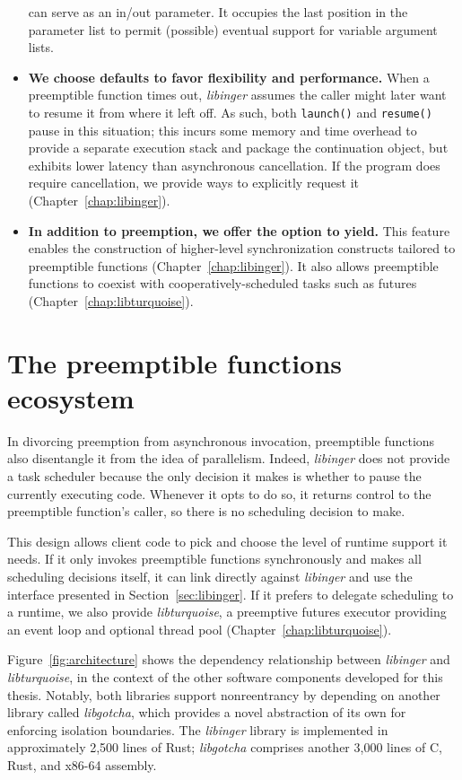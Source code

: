 \begin{itemize}
	can serve as an in/out parameter.  It occupies the last position in the
	parameter list to permit (possible) eventual support for variable argument
	lists.
\item \textbf{We choose defaults to favor flexibility and performance.}  When a
	preemptible function times out, \textit{libinger} assumes the caller might
	later want to resume it from where it left off.  As such, both
	\texttt{launch()} and \texttt{resume()} pause in this situation; this incurs
	some memory and time overhead to provide a separate execution stack and
	package the continuation object, but exhibits lower latency than
	asynchronous cancellation.  If the program does require cancellation, we
	provide ways to explicitly request it (Chapter~\ref{chap:libinger}).
\item \textbf{In addition to preemption, we offer the option to yield.} This feature
	enables the construction of higher-level synchronization constructs tailored
	to preemptible functions (Chapter~\ref{chap:libinger}).  It also allows
	preemptible functions to coexist with cooperatively-scheduled tasks
	such as futures (Chapter~\ref{chap:libturquoise}).
\end{itemize}


\section{The preemptible functions ecosystem}
\label{sec:libinger:concurrency}

In divorcing preemption from asynchronous invocation, preemptible functions also
disentangle it from the idea of parallelism.  Indeed, \textit{libinger} does not
provide a task scheduler because the only decision it makes is whether to pause the
currently executing code.  Whenever it opts to do so, it returns control to the
preemptible function's caller, so there is no scheduling decision to make.

This design allows client code to pick and choose the level of runtime support it
needs.  If it only invokes preemptible functions synchronously and makes all
scheduling decisions itself, it can link directly against \textit{libinger} and use
the interface presented in Section~\ref{sec:libinger}.  If it prefers to delegate
scheduling to a runtime, we also provide \textit{libturquoise}, a preemptive futures
executor providing an event loop and optional thread pool
(Chapter~\ref{chap:libturquoise}).

Figure~\ref{fig:architecture} shows the dependency relationship between
\textit{libinger} and \textit{libturquoise}, in the context of the other software
components developed for this thesis.  Notably, both libraries support nonreentrancy
by depending on another library called \textit{libgotcha}, which provides a novel
abstraction of its own for enforcing isolation boundaries.  The \textit{libinger}
library is implemented in approximately 2,500 lines of Rust; \textit{libgotcha}
comprises another 3,000 lines of C, Rust, and x86-64 assembly.

